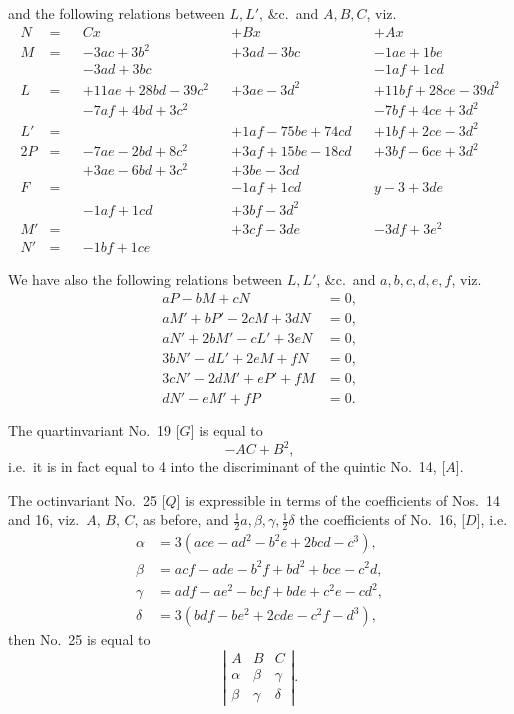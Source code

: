\documentclass[11pt]{article}
\begin{document}
\noindent and the following relations between $L, L'$, \&c.\ and $A, B, C$, viz.
\begin{align*}
N &= && Cx              &&+ Bx              &&+ Ax \\
M &= && -3ac + 3b^2     &&+ 3ad - 3bc       &&- 1ae + 1be \\
  & && -3ad + 3bc       &&                  &&- 1af + 1cd \\
L &= && +11ae + 28bd - 39c^2 && + 3ae - 3d^2 && + 11bf + 28ce - 39d^2 \\
  & && -7af + 4bd + 3c^2 &&                  && -7bf + 4ce + 3d^2 \\
L' &= &&                   && + 1af - 75be + 74cd && + 1bf + 2ce - 3d^2 \\
2P &= && -7ae - 2bd + 8c^2 && + 3af + 15be - 18cd && + 3bf - 6ce + 3d^2 \\
   & && +3ae - 6bd + 3c^2 && + 3be - 3cd && \\
F &= &&                  && -1af + 1cd && y - 3 + 3 de \\
   & && -1af + 1cd && + 3bf - 3d^2 && \\
M' &= &&                  && + 3cf - 3de && - 3df + 3e^2 \\
N' &= && -1bf + 1ce
\end{align*}

\medskip

We have also the following relations between $L, L'$, \&c.\ and $a, b, c, d, e, f$, viz.
\begin{align*}
aP - bM + cN &= 0, \\
aM' + bP' - 2cM + 3dN &= 0, \\
aN' + 2bM' - cL' + 3eN &= 0, \\
3bN' - dL' + 2eM + fN &= 0, \\
3cN' - 2dM' + eP' + fM &= 0, \\
dN' - eM' + fP &= 0.
\end{align*}

The quartinvariant No.\ 19 [$G$] is equal to
\[
- AC + B^2,
\]
i.e.\ it is in fact equal to 4 into the discriminant of the quintic No.\ 14, [$A$].

\medskip

The octinvariant No.\ 25 [$Q$] is expressible in terms of the coefficients of Nos.\ 14 and 16, viz.\ $A$, $B$, $C$, as before, and $\tfrac12 a, \beta, \gamma, \tfrac12 \delta$ the coefficients of No.\ 16, [$D$], i.e.
\begin{align*}
\alpha &= 3(ace - ad^2 - b^2 e + 2bcd - c^3), \\
\beta &= acf - ade - b^2 f + bd^2 + bce - c^2 d, \\
\gamma &= adf - ae^2 - bcf + bde + c^2 e - cd^2, \\
\delta &= 3(bdf - be^2 + 2cde - c^2 f - d^3),
\end{align*}
then No.\ 25 is equal to
\[
\left|\begin{array}{ccc} A & B & C \\ \alpha & \beta & \gamma \\ \beta & \gamma & \delta \end{array}\right| .
\]
\end{document}
